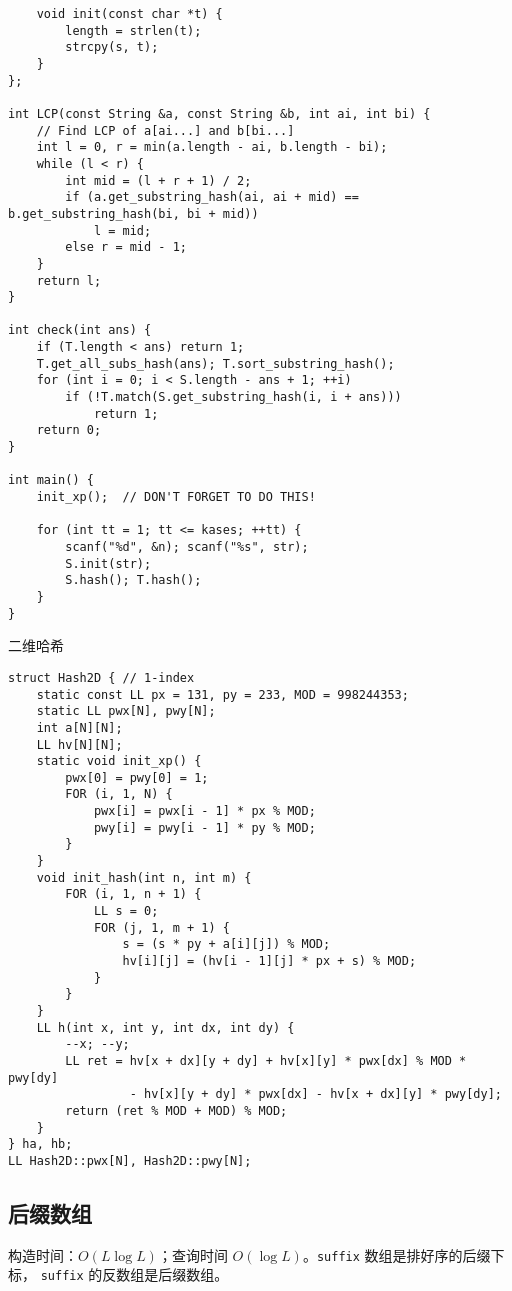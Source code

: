 \documentclass[]{article}
\begin{document}
\begin{verbatim}
    void init(const char *t) {
        length = strlen(t);
        strcpy(s, t);
    }
};

int LCP(const String &a, const String &b, int ai, int bi) {
    // Find LCP of a[ai...] and b[bi...]
    int l = 0, r = min(a.length - ai, b.length - bi);
    while (l < r) {
        int mid = (l + r + 1) / 2;
        if (a.get_substring_hash(ai, ai + mid) == b.get_substring_hash(bi, bi + mid))
            l = mid;
        else r = mid - 1;
    }
    return l;
}

int check(int ans) {
    if (T.length < ans) return 1;
    T.get_all_subs_hash(ans); T.sort_substring_hash();
    for (int i = 0; i < S.length - ans + 1; ++i)
        if (!T.match(S.get_substring_hash(i, i + ans)))
            return 1;
    return 0;
}

int main() {
    init_xp();  // DON'T FORGET TO DO THIS!

    for (int tt = 1; tt <= kases; ++tt) {
        scanf("%d", &n); scanf("%s", str);
        S.init(str);
        S.hash(); T.hash();
    }
}
\end{verbatim}

二维哈希

\begin{verbatim}
struct Hash2D { // 1-index
    static const LL px = 131, py = 233, MOD = 998244353;
    static LL pwx[N], pwy[N];
    int a[N][N];
    LL hv[N][N];
    static void init_xp() {
        pwx[0] = pwy[0] = 1;
        FOR (i, 1, N) {
            pwx[i] = pwx[i - 1] * px % MOD;
            pwy[i] = pwy[i - 1] * py % MOD;
        }
    }
    void init_hash(int n, int m) {
        FOR (i, 1, n + 1) {
            LL s = 0;
            FOR (j, 1, m + 1) {
                s = (s * py + a[i][j]) % MOD;
                hv[i][j] = (hv[i - 1][j] * px + s) % MOD;
            }
        }
    }
    LL h(int x, int y, int dx, int dy) {
        --x; --y;
        LL ret = hv[x + dx][y + dy] + hv[x][y] * pwx[dx] % MOD * pwy[dy]
                 - hv[x][y + dy] * pwx[dx] - hv[x + dx][y] * pwy[dy];
        return (ret % MOD + MOD) % MOD;
    }
} ha, hb;
LL Hash2D::pwx[N], Hash2D::pwy[N];
\end{verbatim}

\hypertarget{ux540eux7f00ux6570ux7ec4}{%
\subsection{后缀数组}\label{ux540eux7f00ux6570ux7ec4}}

构造时间：\(O(L \log L)\)；查询时间 \(O(\log L)\)。\texttt{suffix}
数组是排好序的后缀下标， \texttt{suffix} 的反数组是后缀数组。
\end{document}
